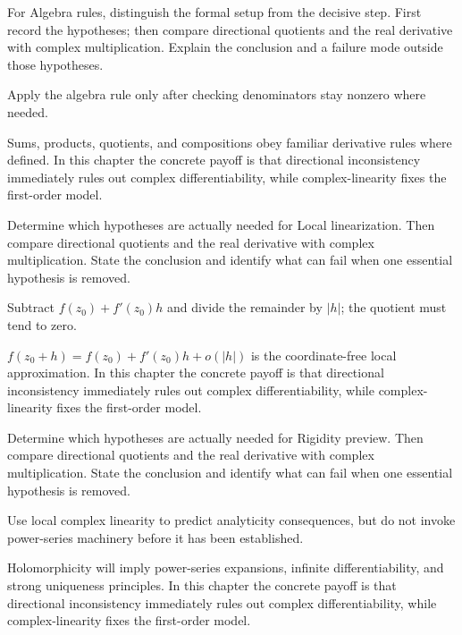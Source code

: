 \begin{exercise}\label{exr:iv01-06}
For Algebra rules, distinguish the formal setup from the decisive step. First record the hypotheses; then compare directional quotients and the real derivative with complex multiplication. Explain the conclusion and a failure mode outside those hypotheses.
\end{exercise}
\begin{hint}
Apply the algebra rule only after checking denominators stay nonzero where needed.
\end{hint}
\begin{solution}
Sums, products, quotients, and compositions obey familiar derivative rules where defined. In this chapter the concrete payoff is that directional inconsistency immediately rules out complex differentiability, while complex-linearity fixes the first-order model.
\end{solution}

\begin{exercise}\label{exr:iv01-07}
Determine which hypotheses are actually needed for Local linearization. Then compare directional quotients and the real derivative with complex multiplication. State the conclusion and identify what can fail when one essential hypothesis is removed.
\end{exercise}
\begin{hint}
Subtract \(f(z_0)+f'(z_0)h\) and divide the remainder by \(|h|\); the quotient must tend to zero.
\end{hint}
\begin{solution}
$f(z_0+h)=f(z_0)+f'(z_0)h+o(|h|)$ is the coordinate-free local approximation. In this chapter the concrete payoff is that directional inconsistency immediately rules out complex differentiability, while complex-linearity fixes the first-order model.
\end{solution}

\begin{exercise}\label{exr:iv01-08}
Determine which hypotheses are actually needed for Rigidity preview. Then compare directional quotients and the real derivative with complex multiplication. State the conclusion and identify what can fail when one essential hypothesis is removed.
\end{exercise}
\begin{hint}
Use local complex linearity to predict analyticity consequences, but do not invoke power-series machinery before it has been established.
\end{hint}
\begin{solution}
Holomorphicity will imply power-series expansions, infinite differentiability, and strong uniqueness principles. In this chapter the concrete payoff is that directional inconsistency immediately rules out complex differentiability, while complex-linearity fixes the first-order model.
\end{solution}

